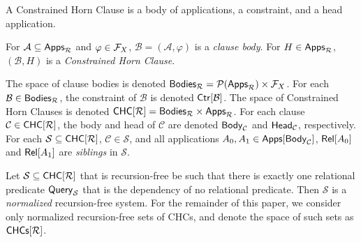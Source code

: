 A Constrained Horn Clause is a body of applications, a constraint, and
a head application.
%
\begin{defn}
  \label{defn:chcs-structure}
  For $\mathcal{A} \subseteq \mathsf{Apps}_{\mathcal{R}}$ and %
  $\varphi \in \mathcal{F}_{X}$, $\mathcal{B} = (\mathcal{A}, \varphi)$
  is a \emph{clause body}.
  For $H \in \mathsf{Apps}_{\mathcal{R}}$, $(\mathcal{B}, H)$ is a
  \emph{Constrained Horn Clause}.
\end{defn}
The space of clause bodies is denoted $\mathsf{Bodies}_{ \mathcal{R} } =
\mathcal{P}(\mathsf{Apps}_{\mathcal{R}}) \times \mathcal{F}_{X}$.
%
For each $\mathcal{B} \in \mathsf{Bodies}_{ \mathcal{R} }$, the constraint of
$\mathcal{B}$ is denoted $\mathsf{Ctr}[ \mathcal{B} ]$.
The space of Constrained Horn Clauses is denoted $\mathsf{CHC}[  \mathcal{R}  ]
= \mathsf{Bodies}_{ \mathcal{R} } \times \mathsf{Apps}_{ \mathcal{R} }$.
%
For each clause $\mathcal{C} \in \mathsf{CHC}[ \mathcal{R} ]$, the body and head
of $\mathcal{C}$ are denoted $\mathsf{Body}_{ \mathcal{C} }$ and $\mathsf{Head}_{
  \mathcal{C} }$, respectively.
For each $\mathcal{S} \subseteq \mathsf{CHC}[  \mathcal{R}  ]$, $\mathcal{C} \in
\mathcal{S}$, and all applications $A_0, A_1 \in \mathsf{Apps}[  \mathsf{Body}_{
    \mathcal{C} }  ]$, $\mathsf{Rel}[ A_0 ]$ and $\mathsf{Rel}[ A_1 ]$ are
\emph{siblings} in $\mathcal{S}$.

Let $\mathcal{S} \subseteq \mathsf{CHC}[  \mathcal{R}  ]$ that is recursion-free
be such that there is exactly one relational predicate $\mathsf{Query}_{
  \mathcal{S} }$ that is the dependency of no relational predicate.
%
Then $\mathcal{S}$ is a \emph{normalized} recursion-free system.
%
For the remainder of this paper, we consider only normalized
recursion-free sets of CHCs, and denote the space of such sets as
$\mathsf{CHCs}[  \mathcal{R}  ]$.

